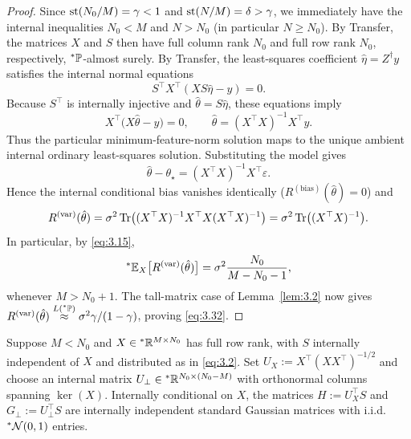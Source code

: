 \begin{proof}
Since $\operatorname{st}(N_0 / M) = \gamma < 1$ and $\operatorname{st}(N / M) = \delta > \gamma$, we immediately have the internal inequalities $N_0 < M$ and $N > N_0$ (in particular $N \ge N_0$). By Transfer, the matrices $X$ and $S$ then have full column rank $N_0$ and full row rank $N_0$, respectively, ${}^*\mathbb{P}$-almost surely. By Transfer, the least-squares coefficient $\hat{\eta} = Z^\dagger y$ satisfies the internal normal equations
\begin{equation}\label{eq:3.33}
S^\top X^\top (XS\hat{\eta} - y) = 0.
\end{equation}
Because $S^\top$ is internally injective and $\hat{\theta} = S\hat{\eta}$, these equations imply
\begin{equation}\label{eq:3.34}
X^\top\bigl(X\hat{\theta} - y\bigr) = 0, \qquad \hat{\theta} = (X^\top X)^{-1} X^\top y.
\end{equation}
Thus the particular minimum-feature-norm solution maps to the unique ambient internal ordinary least-squares solution. Substituting the model gives
\begin{equation}\label{eq:3.35}
\hat{\theta} - \theta_\star = (X^\top X)^{-1} X^\top \varepsilon.
\end{equation}
Hence the internal conditional bias vanishes identically ($R^{(\mathrm{bias})}(\hat{\theta}) = 0$) and
\begin{equation}\label{eq:3.36}
R^{(\mathrm{var})}(\hat{\theta}) = \sigma^2 \operatorname{Tr}\bigl((X^\top X)^{-1} X^\top X (X^\top X)^{-1}\bigr) = \sigma^2 \operatorname{Tr}\bigl((X^\top X)^{-1}\bigr).
\end{equation}
In particular, by \eqref{eq:3.15},
\begin{equation}\label{eq:3.37}
{}^*\mathbb{E}_X\bigl[R^{(\mathrm{var})}(\hat{\theta})\bigr] = \sigma^2 \frac{N_0}{M - N_0 - 1},
\end{equation}
whenever $M > N_0 + 1$. The tall-matrix case of Lemma~\ref{lem:3.2} now gives $R^{(\mathrm{var})}(\hat{\theta}) \stackrel{L({}^*\mathbb{P})}{\approx} \sigma^2 \gamma / (1 - \gamma)$, proving \eqref{eq:3.32}.
\end{proof}

\begin{lemma}\label{lem:3.7}
Suppose $M < N_0$ and $X \in {}^*\mathbb{R}^{M \times N_0}$ has full row rank, with $S$ internally independent of $X$ and distributed as in \eqref{eq:3.2}. Set $U_X := X^\top (X X^\top)^{-1/2}$ and choose an internal matrix $U_\perp \in {}^*\mathbb{R}^{N_0 \times (N_0 - M)}$ with orthonormal columns spanning $\ker(X)$. Internally conditional on $X$, the matrices $H := U_X^\top S$ and $G_\perp := U_\perp^\top S$ are internally independent standard Gaussian matrices with i.i.d.\ ${}^*\mathcal{N}(0, 1)$ entries.
\end{lemma}

